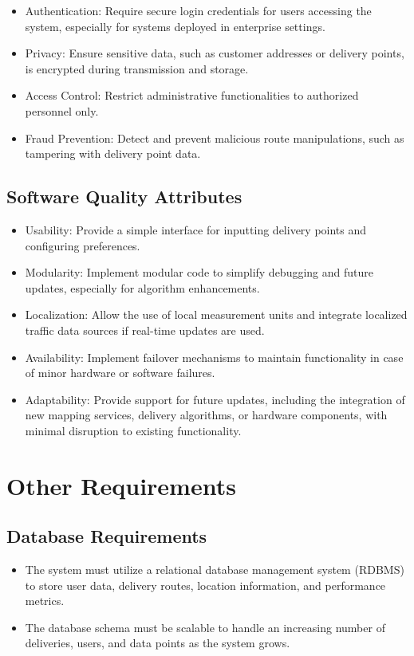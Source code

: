 \begin{itemize}
    \item Authentication: Require secure login credentials for users accessing the system, especially for systems deployed in enterprise settings.
    \item Privacy: Ensure sensitive data, such as customer addresses or delivery points, is encrypted during transmission and storage.
    \item Access Control: Restrict administrative functionalities to authorized personnel only.
    \item Fraud Prevention: Detect and prevent malicious route manipulations, such as tampering with delivery point data.
\end{itemize}

\subsection{Software Quality Attributes}

\begin{itemize}
    \item Usability: Provide a simple interface for inputting delivery points and configuring preferences.
    \item Modularity: Implement modular code to simplify debugging and future updates, especially for algorithm enhancements.
    \item Localization: Allow the use of local measurement units and integrate localized traffic data sources if real-time updates are used.
    \item Availability: Implement failover mechanisms to maintain functionality in case of minor hardware or software failures.
    \item Adaptability: Provide support for future updates, including the integration of new mapping services, delivery algorithms, or hardware components, with minimal disruption to existing functionality.
\end{itemize}

\section{Other Requirements}
\subsection{Database Requirements}

\begin{itemize}
    \item The system must utilize a relational database management system (RDBMS) to store user data, delivery routes, location information, and performance metrics.
    \item The database schema must be scalable to handle an increasing number of deliveries, users, and data points as the system grows.
\end{itemize}

